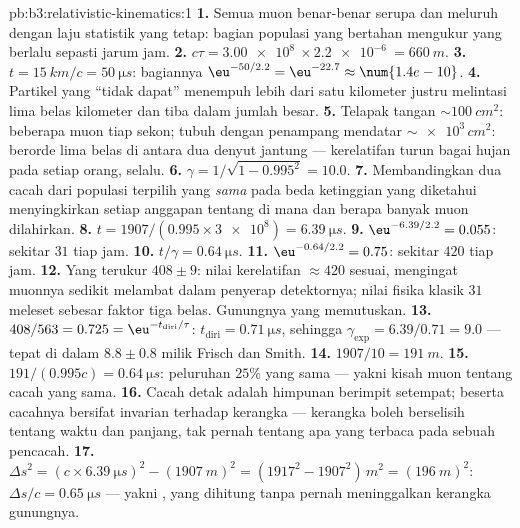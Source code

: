 \begin{solution}{pb:b3:relativistic-kinematics:1}
\textbf{1.} Semua muon benar-benar serupa dan meluruh dengan laju
statistik yang tetap: bagian populasi yang bertahan mengukur 
yang berlalu sepasti jarum jam.
\textbf{2.} $c\tau = \qty{3.00e8}{} \times \qty{2.2e-6}{} =
\qty{660}{m}$.
\textbf{3.} $t = \qty{15}{km}/c = \qty{50}{\micro s}$: bagiannya
$\eu^{-50/2.2} = \eu^{-22.7} \approx \num{1.4e-10}$.
\textbf{4.} Partikel yang ``tidak dapat'' menempuh lebih dari satu
kilometer justru melintasi lima belas kilometer dan tiba dalam jumlah
besar.
\textbf{5.} Telapak tangan $\sim\qty{100}{cm^2}$: beberapa muon tiap
sekon; tubuh dengan penampang mendatar $\sim\num{e3}\,\unit{cm^2}$:
berorde lima belas di antara dua denyut jantung --- kerelatifan turun
bagai hujan pada setiap orang, selalu.
\textbf{6.} $\gamma = 1/\sqrt{1 - 0.995^2} = 10.0$.
\textbf{7.} Membandingkan dua cacah dari populasi terpilih yang
\emph{sama} pada beda ketinggian yang diketahui menyingkirkan setiap
anggapan tentang di mana dan berapa banyak muon dilahirkan.
\textbf{8.} $t = 1907/(0.995 \times \num{3e8}) = \qty{6.39}{\micro s}$.
\textbf{9.} $\eu^{-6.39/2.2} = 0.055$: sekitar $31$ tiap jam.
\textbf{10.} $t/\gamma = \qty{0.64}{\micro s}$.
\textbf{11.} $\eu^{-0.64/2.2} = 0.75$: sekitar $420$ tiap jam.
\textbf{12.} Yang terukur $408 \pm 9$: nilai kerelatifan $\approx 420$
sesuai, mengingat muonnya sedikit melambat dalam penyerap detektornya;
nilai fisika klasik $31$ meleset sebesar faktor tiga belas. Gunungnya
yang memutuskan.
\textbf{13.} $408/563 = 0.725 = \eu^{-t_{\text{diri}}/\tau}$:
$t_{\text{diri}} = \qty{0.71}{\micro s}$, sehingga $\gamma_{\exp} =
6.39/0.71 = 9.0$ --- tepat di dalam $8.8 \pm 0.8$ milik Frisch dan Smith.
\textbf{14.} $1907/10 = \qty{191}{m}$.
\textbf{15.} $191/(0.995c) = \qty{0.64}{\micro s}$: peluruhan $25\%$
yang sama --- yakni kisah muon tentang cacah yang sama.
\textbf{16.} Cacah detak adalah himpunan  berimpit setempat;
 beserta cacahnya bersifat invarian terhadap kerangka ---
kerangka boleh berselisih tentang waktu dan panjang, tak pernah tentang
apa yang terbaca pada sebuah pencacah.
\textbf{17.} $\Delta s^2 = (c \times \qty{6.39}{\micro s})^2 -
(\qty{1907}{m})^2 = (1917^2 - 1907^2)\,\unit{m^2} = (\qty{196}{m})^2$:
$\Delta s/c = \qty{0.65}{\micro s}$ --- yakni , yang
dihitung tanpa pernah meninggalkan kerangka gunungnya.

\end{solution}

